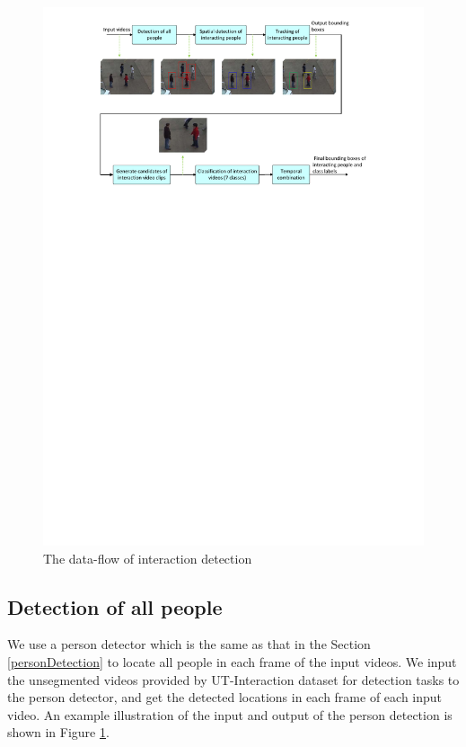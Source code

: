 \begin{figure}
	\includegraphics[trim=2cm 19.5cm 0cm 1cm]{fig01/interaction_detection.pdf}
	\caption{The data-flow of interaction detection}
	\label{fig:interaction_detection}
\end{figure}

\subsection{Detection of all people}
We use a person detector which is the same as that in the Section \ref{personDetection} to locate all people in each frame of the input videos. We input the unsegmented videos provided by UT-Interaction dataset for detection tasks to the person detector, and get the detected locations in each frame of each input video. An example illustration of the input and output of the person detection is shown in Figure \ref{fig:interaction_detection}.


